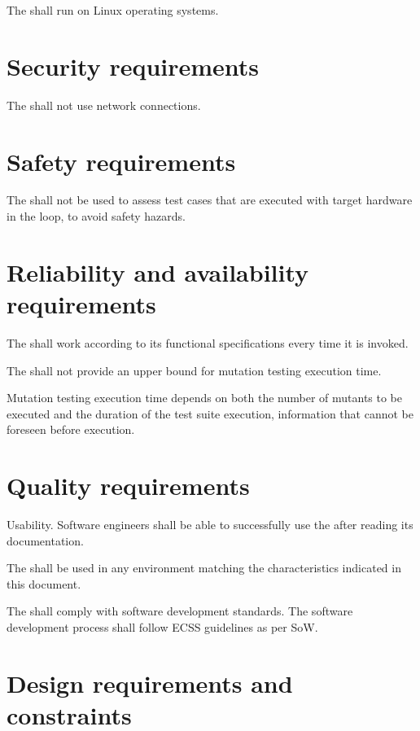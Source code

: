 \RQ{} The \FAQAS shall run on Linux operating systems.



\section{Security requirements }

\RQ{} The \FAQAS shall not use network connections.

\section{Safety requirements}

\RQ{} The \FAQAS shall not be used to assess test cases that are executed with target hardware in the loop, to avoid safety hazards.

\section{Reliability and availability requirements}

\RQ{} The \FAQAS shall work according to its functional specifications every time it is invoked.


\RQ{} The \FAQAS shall not provide an upper bound for mutation testing execution time.

\remark Mutation testing execution time depends on both the number of mutants to be executed and the duration of the test suite execution, information that cannot be foreseen before execution.

\section{Quality requirements}

\RQ{} Usability. Software engineers shall be able to successfully use the \FAQAS after reading its documentation.

\RQ{} The \FAQAS shall be used in any environment matching the characteristics indicated in this document.

\RQ{} The \FAQAS shall comply with software development standards. The software development process shall follow ECSS guidelines as per SoW.


\section{Design requirements and constraints}

